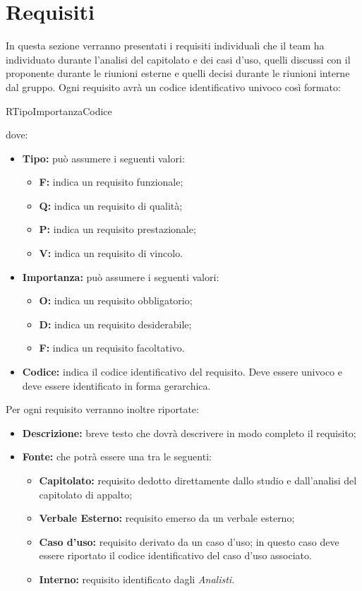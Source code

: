 \documentclass[../AnalisiDeiRequisiti.tex]{subfiles}
\begin{document}
	\section{Requisiti}
	In questa sezione verranno presentati i requisiti individuali che il team ha individuato durante l'analisi del capitolato e dei casi d'uso, quelli discussi con il proponente durante le riunioni esterne e quelli decisi durante le riunioni interne dal gruppo. 
	Ogni requisito avrà un codice identificativo univoco così formato:
	
	\begin{center} R{Tipo}{Importanza}{Codice} \end{center}
	
	dove:
	\begin{itemize}
		\item \textbf{Tipo:} può assumere i seguenti valori:
			\begin{itemize}
				\item \textbf{F:} indica un requisito funzionale;
				\item \textbf{Q:} indica un requisito di qualità;
				\item \textbf{P:} indica un requisito prestazionale;
				\item \textbf{V:} indica un requisito di vincolo.
			\end{itemize}
			\item \textbf{Importanza:} può assumere i seguenti valori:
			\begin{itemize}
				\item \textbf{O:} indica un requisito obbligatorio;
				\item \textbf{D:} indica un requisito desiderabile;
				\item \textbf{F:} indica un requisito facoltativo.
			\end{itemize}
			\item \textbf{Codice:} indica il codice identificativo del requisito. Deve essere univoco e deve essere identificato in forma gerarchica.
	\end{itemize}
	Per ogni requisito verranno inoltre riportate:
	\begin{itemize}
		\item \textbf{Descrizione:} breve testo che dovrà descrivere in modo completo il requisito;
		\item \textbf{Fonte:} che potrà essere una tra le seguenti:
		\begin{itemize}
			\item \textbf{Capitolato:} requisito dedotto direttamente dallo studio e dall'analisi del capitolato di appalto;
			\item \textbf{Verbale Esterno:} requisito emerso da un verbale esterno;
			\item \textbf{Caso d'uso:} requisito derivato  da un caso d'uso; in questo caso deve essere riportato il codice identificativo del caso d'uso associato.
			\item \textbf{Interno:} requisito identificato dagli \textit{Analisti}.
		\end{itemize}
	\end{itemize}
\end{document}
